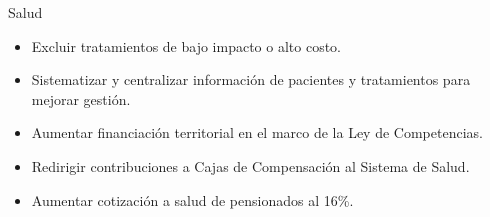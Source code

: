 \begin{frame}{Salud}
\begin{itemize}
    \item Excluir tratamientos de bajo impacto o alto costo.
    \item Sistematizar y centralizar información de pacientes y tratamientos para mejorar gestión.

    \item Aumentar financiación territorial en el marco de la Ley de Competencias.
    \item Redirigir contribuciones a Cajas de Compensación al Sistema de Salud.

    \item Aumentar cotización a salud de pensionados al 16\%.
\end{itemize}
\end{frame}
